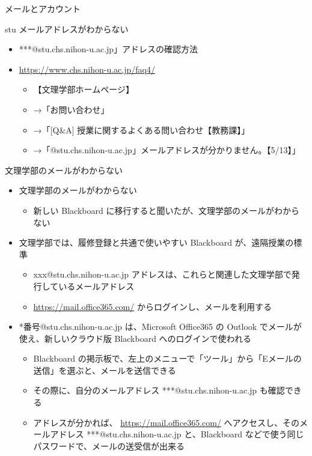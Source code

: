 \documentclass[a4j,10pt]{jsarticle}
\begin{document}
{\newpage\clearpage
{}%
\begin{frame}[label={sec:orgf27b200},fragile]{メールとアカウント}
\begin{block}{stu メールアドレスがわからない}
\begin{itemize}
\item ***@stu.chs.nihon-u.ac.jp」アドレスの確認方法
\item \url{https://www.chs.nihon-u.ac.jp/faq4/}
\begin{itemize}
\item 【文理学部ホームページ】
\item →「お問い合わせ」
\item →「[Q\&A] 授業に関するよくある問い合わせ【教務課】」
\item →「@stu.chs.nihon-u.ac.jp」メールアドレスが分かりません。【5/13】」
\end{itemize}
\end{itemize}
\end{block}
\par
\begin{block}{文理学部のメールがわからない}
\begin{itemize}
\item 文理学部のメールがわからない
\begin{itemize}
\item 新しい Blackboard に移行すると聞いたが、文理学部のメールがわからない
\end{itemize}
\par
\item 文理学部では、履修登録と共通で使いやすい Blackboard が、遠隔授業の標準
\begin{itemize}
\item xxx@stu.chs.nihon-u.ac.jp アドレスは、これらと関連した文理学部で発行しているメールアドレス
\item \url{https://mail.office365.com/} からログインし、メールを利用する
\end{itemize}
\par
\item *番号@stu.chs.nihon-u.ac.jp は、Microsoft Office365 の Outlook でメールが使え、新しいクラウド版 Blackboard へのログインで使われる
\begin{itemize}
\item Blackboard の掲示板で、左上のメニューで「ツール」から「Eメールの送信」を選ぶと、メールを送信できる
\item その際に、自分のメールアドレス ***@stu.chs.nihon-u.ac.jp も確認できる
\item アドレスが分かれば、 \url{https://mail.office365.com/} へアクセスし、そのメールアドレス ***@stu.chs.nihon-u.ac.jp と、Blackboard などで使う同じパスワードで、メールの送受信が出来る

\end{itemize}
\end{itemize}
\end{block}
\end{frame}}
\end{document}
